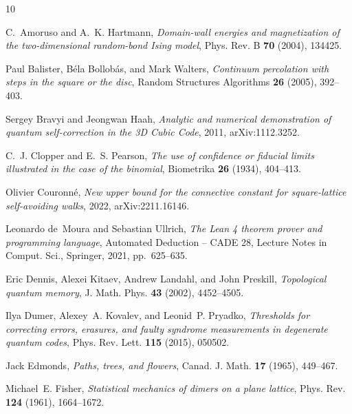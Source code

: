\documentclass[11pt]{amsart}
\theoremstyle{definition}
\theoremstyle{remark}
\numberwithin{equation}{section}
\begin{document}

\providecommand{\bysame}{\leavevmode\hbox to3em{\hrulefill}\thinspace}
\providecommand{\MR}{\relax\ifhmode\unskip\space\fi MR }
\providecommand{\MRhref}[2]{%
  \href{http://www.ams.org/mathscinet-getitem?mr=#1}{#2}
}
\providecommand{\href}[2]{#2}
\begin{thebibliography}{10}

C.~Amoruso and A.~K. Hartmann, \emph{Domain-wall energies and magnetization of
  the two-dimensional random-bond {I}sing model}, Phys. Rev. B \textbf{70}
  (2004), 134425.

Paul Balister, B{\'e}la Bollob{\'a}s, and Mark Walters, \emph{Continuum
  percolation with steps in the square or the disc}, Random Structures
  Algorithms \textbf{26} (2005), 392--403.

Sergey Bravyi and Jeongwan Haah, \emph{Analytic and numerical demonstration of
  quantum self-correction in the {3D} {C}ubic {C}ode}, 2011, arXiv:1112.3252.

C.~J. Clopper and E.~S. Pearson, \emph{The use of confidence or fiducial limits
  illustrated in the case of the binomial}, Biometrika \textbf{26} (1934),
  404--413.

Olivier Couronn{\'e}, \emph{New upper bound for the connective constant for
  square-lattice self-avoiding walks}, 2022, arXiv:2211.16146.

Leonardo de~Moura and Sebastian Ullrich, \emph{The {L}ean 4 theorem prover and
  programming language}, Automated Deduction -- {CADE} 28, Lecture Notes in
  Comput. Sci., Springer, 2021, pp.~625--635.

Eric Dennis, Alexei Kitaev, Andrew Landahl, and John Preskill,
  \emph{Topological quantum memory}, J. Math. Phys. \textbf{43} (2002),
  4452--4505.

Ilya Dumer, Alexey~A. Kovalev, and Leonid~P. Pryadko, \emph{Thresholds for
  correcting errors, erasures, and faulty syndrome measurements in degenerate
  quantum codes}, Phys. Rev. Lett. \textbf{115} (2015), 050502.

Jack Edmonds, \emph{Paths, trees, and flowers}, Canad. J. Math. \textbf{17}
  (1965), 449--467.

Michael~E. Fisher, \emph{Statistical mechanics of dimers on a plane lattice},
  Phys. Rev. \textbf{124} (1961), 1664--1672.


\end{thebibliography}
\end{document}
